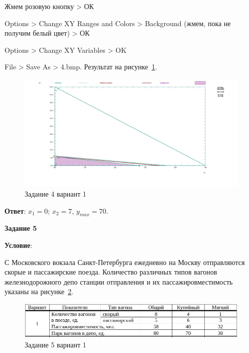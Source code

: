 Жмем розовую кнопку > ОК

Options > Change XY Ranges and Colors > Background (жмем, пока не получим белый цвет) > ОК

Options > Change XY Variables > OK

File > Save As > 4.bmp. Результат на рисунке~\ref{fig:result4_option1}.

\begin{figure}[!htb]
  \centering

  \includegraphics[width=18cm]
  {inc/result4_option1.png}

  \caption{Задание 4 вариант 1}
  \label{fig:result4_option1}
\end{figure}

\textbf{Ответ}: $x_1 = 0$; $x_2 = 7$, $y_{max} = 70$.

\newpage

\begin{center}
  \textbf{Задание 5}
\end{center}

\textbf{Условие}:

С Московского вокзала Санкт-Петербурга ежедневно на Москву отправляются скорые и пассажирские поезда.
Количество различных типов вагонов железнодорожного депо станции отправления
и их пассажировместимость указаны на рисунке~\ref{fig:task5_1}.

\begin{figure}[!htb]
  \centering

  \includegraphics[width=16cm]
  {inc/task5_1.png}

  \caption{Задание 5 вариант 1}
  \label{fig:task5_1}
\end{figure}

